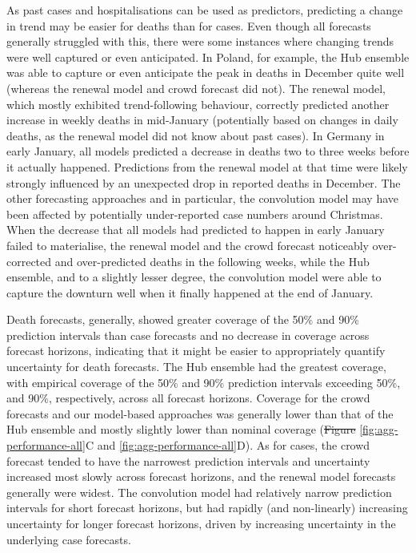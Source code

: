 \documentclass[10pt,letterpaper]{article}
\providecommand{\DIFaddtex}[1]{{\protect\color{blue}\uwave{#1}}} %
\providecommand{\DIFdeltex}[1]{{\protect\color{red}\sout{#1}}}                      %
\providecommand{\DIFaddbegin}{} %
\providecommand{\DIFaddend}{} %
\providecommand{\DIFdelbegin}{} %
\providecommand{\DIFdelend}{} %
\providecommand{\DIFadd}[1]{\texorpdfstring{\DIFaddtex{#1}}{#1}} %
\providecommand{\DIFdel}[1]{\texorpdfstring{\DIFdeltex{#1}}{}} %
\newcommand{\DIFscaledelfig}{0.5}
\newlength{\DIFdelgraphicswidth} %
\newlength{\DIFdelgraphicsheight} %
\newcommand{\DIFaddincludegraphics}[2][]{{\color{blue}\fbox{\DIFOincludegraphics[#1]{#2}}}} %
\newcommand{\DIFdelincludegraphics}[2][]{%
\sbox{\DIFdelgraphicsbox}{\DIFOincludegraphics[#1]{#2}}%
\settoboxwidth{\DIFdelgraphicswidth}{\DIFdelgraphicsbox} %
\settoboxtotalheight{\DIFdelgraphicsheight}{\DIFdelgraphicsbox} %
\scalebox{\DIFscaledelfig}{%
\parbox[b]{\DIFdelgraphicswidth}{\usebox{\DIFdelgraphicsbox}\\[-\baselineskip] \rule{\DIFdelgraphicswidth}{0em}}\llap{\resizebox{\DIFdelgraphicswidth}{\DIFdelgraphicsheight}{%
\setlength{\unitlength}{\DIFdelgraphicswidth}%
\begin{picture}(1,1)%
\thicklines\linethickness{2pt} %
{\color[rgb]{1,0,0}\put(0,0){\framebox(1,1){}}}%
{\color[rgb]{1,0,0}\put(0,0){\line( 1,1){1}}}%
{\color[rgb]{1,0,0}\put(0,1){\line(1,-1){1}}}%
\end{picture}%
}\hspace*{3pt}}} %
} %
\DeclareRobustCommand{\DIFaddbegin}{\DIFOaddbegin \let\includegraphics\DIFaddincludegraphics} %
\DeclareRobustCommand{\DIFaddend}{\DIFOaddend \let\includegraphics\DIFOincludegraphics} %
\DeclareRobustCommand{\DIFdelbegin}{\DIFOdelbegin \let\includegraphics\DIFdelincludegraphics} %
\DeclareRobustCommand{\DIFdelend}{\DIFOaddend \let\includegraphics\DIFOincludegraphics} %
\begin{document}
As past cases and hospitalisations can be used as predictors, predicting
a change in trend may be easier for deaths than for cases. Even though
all forecasts generally struggled with this, there were some instances
where changing trends were well captured or even anticipated. In Poland,
for example, the Hub ensemble was able to capture or even anticipate the
peak in deaths in December quite well (whereas the renewal model and
crowd forecast did not). The renewal model, which mostly exhibited
trend-following behaviour, correctly predicted another increase in
weekly deaths in mid-January (potentially based on changes in daily
deaths, as the renewal model did not know about past cases). In Germany
in early January, all models predicted a decrease in deaths two to three
weeks before it actually happened. Predictions from the renewal model at
that time were likely strongly influenced by an unexpected drop in
reported deaths in December. The other forecasting approaches and in
particular, the convolution model may have been affected by potentially
under-reported case numbers around Christmas. When the decrease that all
models had predicted to happen in early January failed to materialise,
the renewal model and the crowd forecast noticeably over-corrected and
over-predicted deaths in the following weeks, while the Hub ensemble,
and to a slightly lesser degree, the convolution model were able to
capture the downturn well when it finally happened at the end of
January.

Death forecasts, generally, showed greater coverage of the 50\% and 90\%
prediction intervals than case forecasts and no decrease in coverage
across forecast horizons, indicating that it might be easier to
appropriately quantify uncertainty for death forecasts. The Hub ensemble
had the greatest coverage, with empirical coverage of the 50\% and 90\%
prediction intervals exceeding 50\%, and 90\%, respectively, across all
forecast horizons. Coverage for the crowd forecasts and our model-based
approaches was generally lower than that of the Hub ensemble and mostly
slightly lower than nominal coverage (\DIFdelbegin \DIFdel{Figure
}\DIFdelend \DIFaddbegin \DIFadd{Fig }\DIFaddend \ref{fig:agg-performance-all}C
and \ref{fig:agg-performance-all}D). As for cases, the crowd forecast
tended to have the narrowest prediction intervals and uncertainty
increased most slowly across forecast horizons, and the renewal model
forecasts generally were widest. The convolution model had relatively
narrow prediction intervals for short forecast horizons, but had rapidly
(and non-linearly) increasing uncertainty for longer forecast horizons,
driven by increasing uncertainty in the underlying case forecasts.
\end{document}
